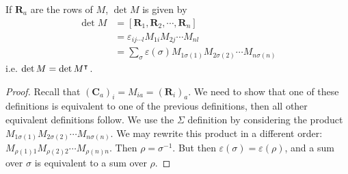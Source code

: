 \documentclass{article}
\begin{document}
\begin{proposition}
	If $\bm R_a$ are the rows of $M$, $\det M$ is given by
	\begin{align*}
		\det M
		 & = [\bm R_1, \bm R_2, \cdots, \bm R_n]                                                \\
		 & = \varepsilon_{ij\cdots l}M_{1i}M_{2j} \cdots M_{nl}                                 \\
		 & = \sum_\sigma \varepsilon(\sigma) M_{1\sigma(1)}M_{2\sigma(2)} \cdots M_{n\sigma(n)}
	\end{align*}
	i.e. $\det M = \det M^\intercal$.
\end{proposition}
\begin{proof}
	Recall that $(\bm C_a)_i = M_{ia} = (\bm R_i)_a$. We need to show that one of these definitions is equivalent to one of the previous definitions, then all other equivalent definitions follow. We use the $\Sigma$ definition by considering the product $M_{1\sigma(1)}M_{2\sigma(2)} \cdots M_{n\sigma(n)}$. We may rewrite this product in a different order: $M_{\rho(1)1}M_{\rho(2)2} \cdots M_{\rho(n)n}$. Then $\rho = \sigma^{-1}$. But then $\varepsilon(\sigma) = \varepsilon(\rho)$, and a sum over $\sigma$ is equivalent to a sum over $\rho$.
\end{proof}
\end{document}
